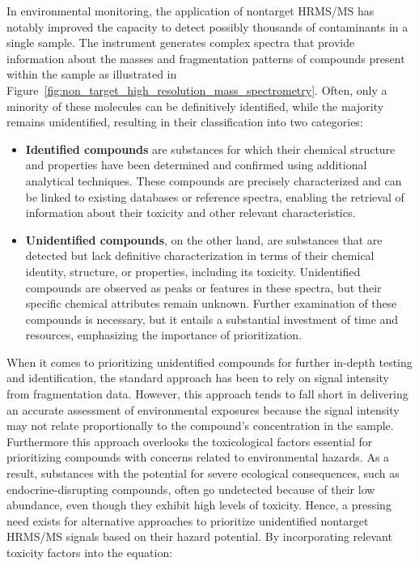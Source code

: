 In environmental monitoring, the application of nontarget HRMS/MS has notably improved the capacity to detect possibly thousands of contaminants in a single sample. The instrument generates complex spectra that provide information about the masses and fragmentation patterns of compounds present within the sample as illustrated in Figure~\ref{fig:non_target_high_resolution_mass_spectrometry}. Often, only a minority of these molecules can be definitively identified, while the majority remains unidentified, resulting in their classification into two categories:
\begin{itemize}
    \item \textbf{Identified compounds} are substances for which their chemical structure and properties have been determined and confirmed using additional analytical techniques. These compounds are precisely characterized and can be linked to existing databases or reference spectra, enabling the retrieval of information about their toxicity and other relevant characteristics.
    \item \textbf{Unidentified compounds}, on the other hand, are substances that are detected but lack definitive characterization in terms of their chemical identity, structure, or properties, including its toxicity. Unidentified compounds are observed as peaks or features in these spectra, but their specific chemical attributes remain unknown. 
    Further examination of these compounds is necessary, but it entails a substantial investment of time and resources, emphasizing the importance of prioritization.
    
\end{itemize}

When it comes to prioritizing unidentified compounds for further in-depth testing and identification, the standard approach has been to rely on signal intensity from fragmentation data. However, this approach tends to fall short in delivering an accurate assessment of environmental exposures because the signal intensity may not relate proportionally to the compound's concentration in the sample. Furthermore this approach overlooks the toxicological factors essential for prioritizing compounds with concerns related to environmental hazards. As a result, substances with the potential for severe ecological consequences, such as endocrine-disrupting compounds, often go undetected because of their low abundance, even though they exhibit high levels of toxicity. Hence, a pressing need exists for alternative approaches to prioritize unidentified nontarget HRMS/MS signals based on their hazard potential. By incorporating relevant toxicity factors into the equation:

